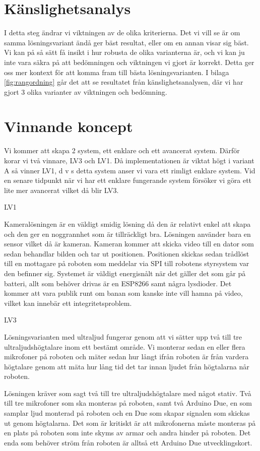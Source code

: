 \documentclass[11pt, a4paper]{report}
\begin{document}
\section{Känslighetsanalys}

I detta steg ändrar vi viktningen av de olika kriterierna. Det vi vill se är om samma lösningsvariant ändå ger bäst resultat, eller om en annan visar sig bäst. Vi kan på så sätt få insikt i hur robusta de olika varianterna är, och vi kan ju inte vara säkra på att bedömningen och viktningen vi gjort är korrekt. Detta ger oss mer kontext för att komma fram till bästa lösningsvarianten. I bilaga \ref{fig:rangordning} går det att se resultatet från känslighetsanalysen, där vi har gjort 3 olika varianter av viktningen och bedömning.

\section{Vinnande koncept}

Vi kommer att skapa 2 system, ett enklare och ett avancerat system. Därför korar vi två vinnare, LV3 och LV1. Då implementationen är viktat högt i variant A så vinner LV1, d v s detta system anser vi vara ett rimligt enklare system. Vid en senare tidpunkt när vi har ett enklare fungerande system försöker vi göra ett lite mer avancerat vilket då blir LV3.


LV1

Kameralösningen är en väldigt smidig lösning då den är relativt enkel att skapa och den ger en noggrannhet som är tillräckligt bra. Lösningen använder bara en sensor vilket då är kameran.
Kameran kommer att skicka video till en dator som sedan behandlar bilden och tar ut positionen. Positionen skickas sedan trådlöst till en mottagare på roboten som meddelar via SPI till robotens styrsystem var den befinner sig. Systemet är väldigt energisnålt när det gäller det som går på batteri, allt som behöver drivas är en ESP8266 samt några lysdioder. Det kommer att vara publik runt om banan som kanske inte vill hamna på video, vilket kan innebär ett integritetsproblem.


LV3

Lösningsvarianten med ultraljud fungerar genom att vi sätter upp två till tre ultraljudshögtalare inom ett bestämt område. Vi monterar sedan en eller flera mikrofoner på roboten och mäter sedan hur långt ifrån roboten är från vardera högtalare genom att mäta hur lång tid det tar innan ljudet från högtalarna når roboten.

Lösningen kräver som sagt två till tre ultraljudshögtalare med något stativ. Två till tre mikrofoner som ska monteras på roboten, samt två Arduino Due, en som samplar ljud monterad på roboten och en Due som skapar signalen som skickas ut genom högtalarna.
Det som är kritiskt är att mikrofonerna måste monteras på en plats på roboten som inte skyms av armar och andra hinder på roboten.
Det enda som behöver ström från roboten är alltså ett Arduino Due utvecklingskort.
\end{document}
